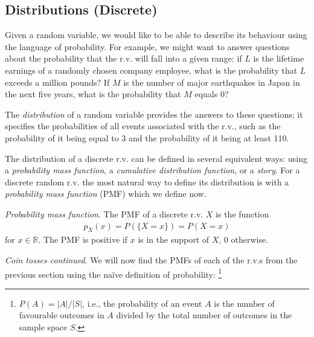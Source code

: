 \documentclass[11pt,a4paper]{article}
\begin{document}
\subsection{Distributions (Discrete)}

Given a random variable, 
we would like to be able to describe its
behaviour using the language of probability. 
For example, 
we might want to answer questions 
about the probability that the r.v. will fall into a given range: 
if \(L\) is the lifetime earnings of a randomly chosen company employee, 
what is the probability that \(L\) exceeds a million pounds? 
If \(M\) is the number of major earthquakes in Japan in the next five years, 
what is the probability that \(M\) equals 0? 

The \emph{distribution} of a random variable provides the answers to these questions; 
it specifies the probabilities of all events associated with the r.v., 
such as the probability of it being equal to 3 and the probability of it being at least 110.

The distribution of a discrete r.v. can be defined in several equivalent ways: 
using a \emph{probability mass function},
a \emph{cumulative distribution function},
or a \emph{story}.
For a discrete random r.v. the most natural way to define its distribution
is with a \emph{probability mass function} (PMF) which we define now.

\emph{Probability mass function}. 
The PMF of a discrete r.v. \(X\) is the function
\begin{align}
p_{X}(x)=P\left(\{X=x\}\right)=P(X=x)
\end{align}
for \(x \in \mathbb{R}\). 
The PMF is positive if \(x\) is in the support of \(X\), 0 otherwise.

\emph{Coin tosses continued}. 
We will now find the PMFs of each of the r.v.s from 
the previous section using the naïve definition of probability:%
\footnote{%
\(P(A) = |A|/|S|\), i.e., 
the probability of an event \(A\) is the number of 
favourable outcomes in \(A\) divided by
the total number of outcomes in the sample space \(S\).}
\end{document}
